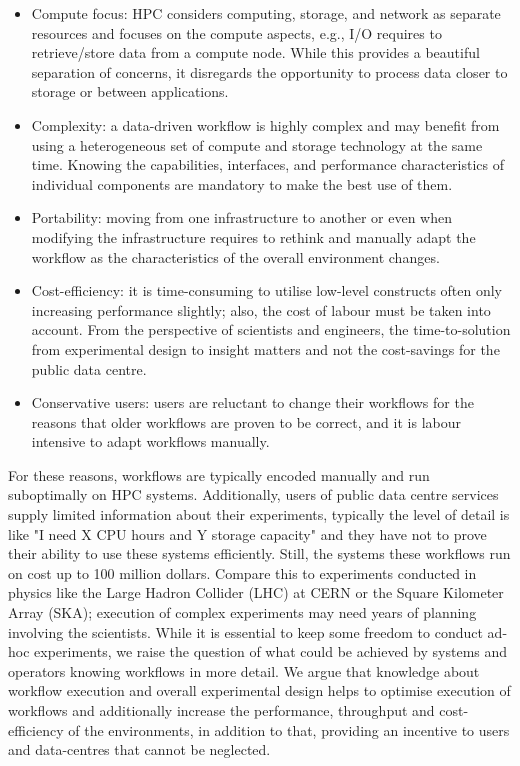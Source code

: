 \documentclass[a4paper, twocolumn]{article}
\begin{document}
\begin{itemize}
  \item Compute focus: HPC considers computing, storage, and network as separate resources and focuses on the compute aspects, e.g., I/O requires to retrieve/store data from a compute node.
  While this provides a beautiful separation of concerns, it disregards the opportunity to process data closer to storage or between applications.
  \item Complexity: a data-driven workflow is highly complex and may benefit from using a heterogeneous set of compute and storage technology at the same time.
  Knowing the capabilities, interfaces, and performance characteristics of individual components are mandatory to make the best use of them.
  \item Portability: moving from one infrastructure to another or even when modifying the infrastructure requires to rethink and manually adapt the workflow as the characteristics of the overall environment changes.
  \item Cost-efficiency: it is time-consuming to utilise low-level constructs often only increasing performance slightly; also, the cost of labour must be taken into account.
  From the perspective of scientists and engineers, the time-to-solution from experimental design to insight matters and not the cost-savings for the public data centre.
  \item Conservative users: users are reluctant to change their workflows for the reasons that older workflows are proven to be correct, and it is labour intensive to adapt workflows manually.
\end{itemize}

For these reasons, workflows are typically encoded manually and run suboptimally on HPC systems.
Additionally, users of public data centre services supply limited information about their experiments, typically the level of detail is like "I need X CPU hours and Y storage capacity" and they have not to prove their ability to use these systems efficiently.
Still, the systems these workflows run on cost up to 100 million dollars.
Compare this to experiments conducted in physics like the Large Hadron Collider (LHC) at CERN or the Square Kilometer Array (SKA); execution of complex experiments may need years of planning involving the scientists.
While it is essential to keep some freedom to conduct ad-hoc experiments, we raise the question of what could be achieved by systems and operators knowing workflows in more detail.
We argue that knowledge about workflow execution and overall experimental design helps to
optimise execution of workflows and additionally increase the performance, throughput and cost-efficiency of the environments, in addition to that, providing an incentive to users and data-centres that cannot be neglected.
\end{document}
